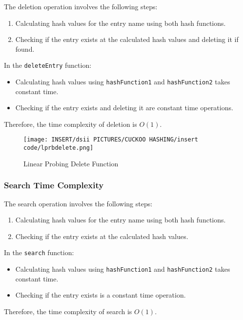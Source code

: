 \documentclass[12pt]{article}
\begin{document}
The deletion operation involves the following steps:
\begin{enumerate}
    \item Calculating hash values for the entry name using both hash functions.
    \item Checking if the entry exists at the calculated hash values and deleting it if found.
\end{enumerate}

In the \texttt{deleteEntry} function:
\begin{itemize}
    \item Calculating hash values using \texttt{hashFunction1} and \texttt{hashFunction2} takes constant time.
    \item Checking if the entry exists and deleting it are constant time operations.
\end{itemize}

Therefore, the time complexity of deletion is $O(1)$.

\begin{figure}[htbp]
    \centering
    \texttt{[image: INSERT/dsii PICTURES/CUCKOO HASHING/insert code/lprbdelete.png]}
    \caption{Linear Probing Delete Function}
    \label{fig:linear_deletion}
\end{figure}

\newpage

\subsubsection{Search Time Complexity}

The search operation involves the following steps:
\begin{enumerate}
    \item Calculating hash values for the entry name using both hash functions.
    \item Checking if the entry exists at the calculated hash values.
\end{enumerate}

In the \texttt{search} function:
\begin{itemize}
    \item Calculating hash values using \texttt{hashFunction1} and \texttt{hashFunction2} takes constant time.
    \item Checking if the entry exists is a constant time operation.
\end{itemize}

Therefore, the time complexity of search is $O(1)$.
\end{document}
